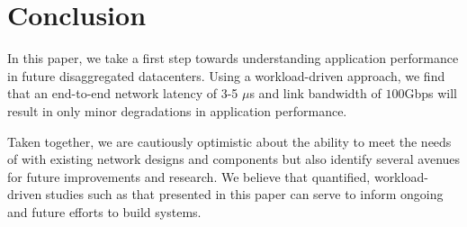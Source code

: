 \section{Conclusion}
In this paper, we take a first step towards understanding application performance in future disaggregated datacenters. Using a workload-driven approach, we find that an end-to-end network latency of 3-5 $\mu$s and link bandwidth of $100$Gbps will result in only minor degradations in application performance.

Taken together, we are cautiously optimistic about the ability to meet the needs of \dis with existing network designs and components but also identify several avenues for future improvements and research. We believe that quantified, workload-driven studies such as that presented in this paper can serve to inform ongoing and future efforts to build \dis systems. 

